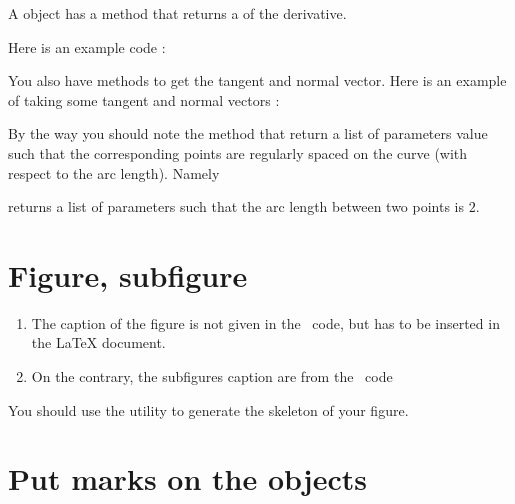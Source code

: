 A  object has a method  that returns a  of the derivative.

Here is an example code :



\begin{center}
   
\end{center}

You also have methods to get the tangent and normal vector. Here is an example of taking some tangent and normal vectors :



\begin{center}
   
\end{center}

By the way you should note the method  that return a list of parameters value such that the corresponding points are regularly spaced on the curve (with respect to the arc length). Namely



returns a list of parameters such that the arc length between two points is \( 2\).

\section{Figure, subfigure}

\begin{enumerate}
    \item
        The caption of the figure is not given in the \phystricks\ code, but has to be inserted in the LaTeX document.
    \item 
        On the contrary, the subfigures caption are from the \phystricks\ code
\end{enumerate}
You should use the utility  to generate the skeleton of your figure.

\section{Put marks on the objects}

